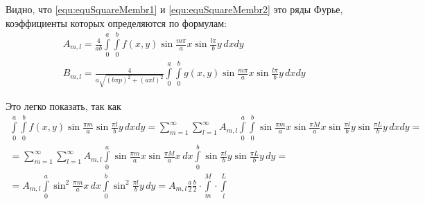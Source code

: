 Видно, что \eqref{equ:equSquareMembr1} и \eqref{equ:equSquareMembr2} это ряды Фурье, коэффициенты которых определяются по формулам:
	\begin{align*}
		&A_{m,l} = \frac{4}{ab} \int\limits_0^a \int\limits_0^b f(x,y)\sin \frac{m \pi}{a} x \sin\frac{l \pi}{b} y\, dx dy\\
		&B_{m,l} = \frac{4}{a \sqrt{(b \pi p)^2 + (a \pi l)^2}} \int\limits_0^a \int\limits_0^b g(x,y) \sin \frac{m \pi}{a} x \sin \frac{l \pi}{b} y\, dx dy
	\end{align*}

	Это легко показать, так как
	\begin{multline*}
	 \int\limits_0^a\int\limits_0^b f(x,y) \sin \frac{\pi m}{a} \sin \frac{\pi l}{b} y\,  dx dy = \sum\limits_{m=1}^{\infty} \sum\limits_{l = 1}^{\infty} A_{m,l} \int\limits_0^a\int\limits_0^b \sin \frac{\pi m}{a} x \sin \frac{\pi M}{a} x \sin \frac{\pi l}{b} y \sin \frac{\pi L}{b} y\, dx dy =\\	
		 = \sum\limits_{m=1}^{\infty} \sum\limits_{l = 1}^{\infty} A_{m,l} \int\limits_0^a \sin \frac{\pi m }{a} x \sin\frac{\pi M }{a}x\, dx \int\limits_0^b \sin \frac{\pi l }{b} y \sin \frac{\pi L}{b}y\, dy = \\
		= A_{m,l}  \int\limits_0^a \sin^2 \frac{\pi m}{a} x\,  dx \int\limits_0^b \sin^2 \frac{\pi l}{b} y\, dy = A_{m,l} \frac{a}{2} \frac{b}{2} \cdot \int\limits_m^M \cdot \int\limits_l^L
	\end{multline*}
